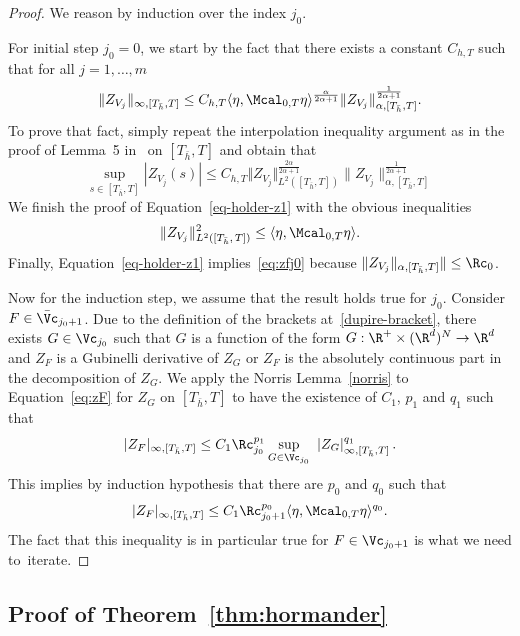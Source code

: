 \begin{proof}
We reason by induction over the index $j_0$.

For initial step $j_0 = 0$, we start by the fact that there exists a constant $C_{h,T}$ such that for all $j=1,\dots, m$
\begin{equation}\label{eq-holder-z1}
\|Z_{V_j} \|_{\infty, [T_{\bar h},T]} \leq C_{h,T} \langle \eta, \Mcal_{0,T} \eta \rangle^{\frac{\alpha}{2\alpha+1}} \|Z_{V_j} \|^{\frac{1}{2\alpha+1}}_{\alpha,[T_{\bar h},T]}.
\end{equation}
To prove that fact, simply repeat the interpolation inequality argument as in the proof of Lemma~5 in~\cite{HP13} on $[T_{\bar h},T]$ and obtain that
\begin{equation}
\sup_{s\in [T_{\bar h},T]} \left| Z_{V_j} (s) \right|
\leq C_{h,T} \Vert Z_{V_j} \Vert^{\frac{2\alpha}{2\alpha+1}}_{L^2([T_{\bar h},T])} \|Z_{V_j} \|^{\frac{1}{2\alpha+1}}_{\alpha,[T_{\bar h},T]}
\end{equation}
We finish the proof of Equation~\eqref{eq-holder-z1} with the obvious inequalities
\[
\Vert Z_{V_j} \Vert^2_{L^2([T_{\bar h},\,T])}\leq \langle \eta, \Mcal_{0,T} \eta \rangle.
\]
Finally, Equation~\eqref{eq-holder-z1} implies~\eqref{eq:zfj0} because $\|Z_{V_j} \|_{\alpha,[T_{\bar h},T]} \| \leq \Rc_0$.

Now for the induction step, we assume that the result holds true for $j_0$. Consider $F \in \bar \Vc_{j_0+1}$. Due to the definition of the brackets at~\eqref{dupire-bracket}, there exists $G\in \Vc_{j_0}$ such that $G$ is a function of the form $G:\R^+\times (\R^{d})^N\to \R^d$ and $Z_F$ is a Gubinelli derivative of $Z_G$ or $Z_F$ is the absolutely continuous part in the decomposition of $Z_G$. We apply the Norris Lemma~\ref{norris} to Equation~\eqref{eq:zF} for $Z_G$ on $[T_{\bar h},T]$ to have the existence of $C_1$, $p_1$ and $q_1$ such that
\[
|Z_F|_{\infty, [T_{\bar h},T]} \leq C_1 \Rc_{j_0}^{p_1} \sup_{G \in \Vc_{j_0}}\ |Z_G|_{\infty, [T_{\bar h},T]}^{q_1} \, .
\]
This implies by induction hypothesis that there are $p_0$ and $q_0$ such that
\[
|Z_F|_{\infty, [T_{\bar h},T]} \leq C_1\Rc_{j_0+1}^{p_0}\langle \eta, \Mcal_{0,T} \eta \rangle^{q_0}.
\]
The fact that this inequality is in particular true for $F\in \Vc_{j_0+1}$ is what we need to~iterate.
\end{proof}


\subsection{Proof of Theorem~\ref{thm:hormander}}\label{subsection-proof-hormander}

